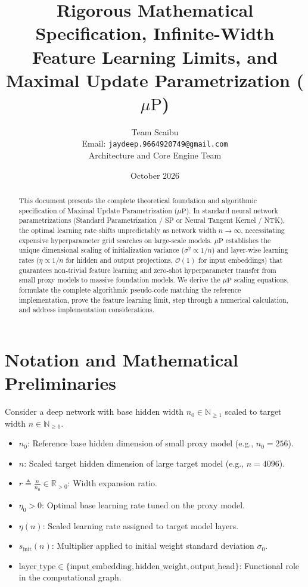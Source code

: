 \documentclass[11pt,a4paper]{article}
\title{\textbf{Rigorous Mathematical Specification, Infinite-Width Feature Learning Limits, and Maximal Update Parametrization ($\mu\text{P}$)}}
\author{Team Scaibu \\ \small Email: \texttt{jaydeep.9664920749@gmail.com} \\ \small Architecture and Core Engine Team}
\date{October 2026}
\theoremstyle{definition}
\begin{document}
\maketitle

\begin{abstract}
This document presents the complete theoretical foundation and algorithmic specification of Maximal Update Parametrization ($\mu\text{P}$). In standard neural network parametrizations (Standard Parametrization / SP or Neural Tangent Kernel / NTK), the optimal learning rate shifts unpredictably as network width $n \to \infty$, necessitating expensive hyperparameter grid searches on large-scale models. $\mu\text{P}$ establishes the unique dimensional scaling of initialization variance ($\sigma^2 \propto 1/n$) and layer-wise learning rates ($\eta \propto 1/n$ for hidden and output projections, $\mathcal{O}(1)$ for input embeddings) that guarantees non-trivial feature learning and zero-shot hyperparameter transfer from small proxy models to massive foundation models. We derive the $\mu\text{P}$ scaling equations, formulate the complete algorithmic pseudo-code matching the reference implementation, prove the feature learning limit, step through a numerical calculation, and address implementation considerations.
\end{abstract}

\section{Notation and Mathematical Preliminaries}

Consider a deep network with base hidden width $n_0 \in \mathbb{N}_{\ge 1}$ scaled to target width $n \in \mathbb{N}_{\ge 1}$.

\begin{itemize}
    \item $n_0$: Reference base hidden dimension of small proxy model (e.g., $n_0 = 256$).
    \item $n$: Scaled target hidden dimension of large target model (e.g., $n = 4096$).
    \item $r \triangleq \frac{n}{n_0} \in \mathbb{R}_{> 0}$: Width expansion ratio.
    \item $\eta_0 > 0$: Optimal base learning rate tuned on the proxy model.
    \item $\eta(n)$: Scaled learning rate assigned to target model layers.
    \item $s_{\text{init}}(n)$: Multiplier applied to initial weight standard deviation $\sigma_0$.
    \item $\text{layer\_type} \in \{\text{input\_embedding}, \text{hidden\_weight}, \text{output\_head}\}$: Functional role in the computational graph.
\end{itemize}
\end{document}
